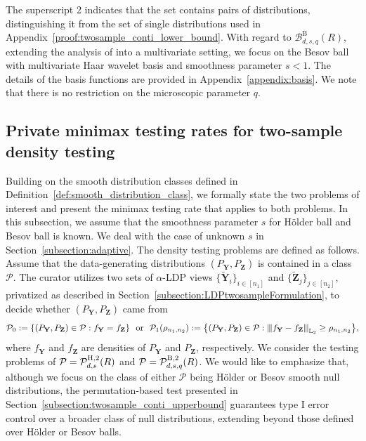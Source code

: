 \documentclass[twoside,11pt]{article}
\newcommand{\distClassGeneric}{\mathcal{P}}
\newcommand{\rhoTwosample}{\rho_{\sampleSize_1, \sampleSize_2}}
\newcommand{\Ell}{\mathbb{L}}
\newcommand{\normEllp}[3]{
	\vertiii{#1}_{\Ell_{#2}}^{#3}
}
\newcommand{\vertiii}[1]{
	{\left\vert\kern-0.25ex\left\vert\kern-0.25ex\left\vert #1 
		\right\vert\kern-0.25ex\right\vert\kern-0.25ex\right\vert}
}%
\newcommand{\rvTwo}{Y}
\newcommand{\vectorize}[1]{\mathbf{#1}}
\newcommand{\rvZ}{Z}
\newcommand{\rVecZ}{\vectorize{\rvZ}}
\newcommand{\rVecZPriv}{\tilde{\rVecZ}} %
\newcommand{\sampleIndexOne}{i}
\newcommand{\sampleIndexTwo}{j}
\newcommand{\sampleSets}[3]{\{{#1}_{#2}\}_{#2 \in [#3]}}
\newcommand{\dimDensity}{d} %
\newcommand{\sampleSize}{n}
\newcommand{\smoothness}{s}
\newcommand{\ballRadius}{R}
\newcommand{\privacyParameter}{\alpha} %
\newcommand{\besovParamMicroscope}{q}
\newcommand{\ballDistn}{\mathcal{B}}
\newcommand{\besovBall}[2]{\ballDistn_{\dimDensity,\smoothness, #2}^{\mathrm{B}}(\ballRadius)}
\newcommand{\pBesovTs}{ %
	\distClassGeneric_{%
		\dimDensity, \smoothness, \besovParamMicroscope
	}^{%
		\mathrm{B,2}
	}
	(\ballRadius)
}
\newcommand{\pHolderTs}{ %
	\distClassGeneric_{%
		\dimDensity, \smoothness
	}^{%
		\mathrm{H,2}
	}
	(\ballRadius)
}
\begin{document}
The superscript 2 indicates that the set contains pairs of distributions, distinguishing it from the set of single distributions used in Appendix~\ref{proof:twosample_conti_lower_bound}.
With regard to $\besovBall{2}{q}$, extending the analysis of \citep{Lam-Weil2021MinimaxConstraint} into a multivariate setting, we focus on the Besov ball with multivariate Haar wavelet basis and smoothness parameter $\smoothness < 1$.
The details of the basis functions are provided in Appendix~\ref{appendix:basis}.
We note that there is no restriction on the microscopic parameter $q$.
%
\subsection{Private minimax testing rates for two-sample density testing}\label{subsection:twosample_conti_rates}
Building on the smooth distribution classes defined in Definition~\ref{def:smooth_distribution_class}, we formally state the two problems of interest and present the minimax testing rate that applies to both problems. In this subsection, we assume that the smoothness parameter $s$ for H\"{o}lder ball and Besov ball is known. We deal with the case of unknown $s$ in Section~\ref{subsection:adaptive}. %
The density testing problems  are defined  as follows.
Assume that the data-generating distributions $(P_{\vectorize{Y}}, P_{\vectorize{Z}})$ is contained in a class $\distClassGeneric$.
The curator utilizes two sets of $\privacyParameter$-LDP views $\sampleSets{\tilde{\vectorize{\rvTwo}}}{\sampleIndexOne}{\sampleSize_1}$ and $\sampleSets{\rVecZPriv}{\sampleIndexTwo}{\sampleSize_2}$, privatized as described in Section~\ref{subsection:LDPtwosampleFormulation},  to decide whether $(P_{\vectorize{Y}}, P_{\vectorize{Z}})$ came from
\begin{equation}\label{hypothesis:twosample_Holder_alt} 
	\distClassGeneric_0
	:=
	\{
	(P_{\vectorize{Y}}, P_{\vectorize{Z}})
	\in
	\distClassGeneric
	:
	f_{\vectorize{Y}}
	= f_{\vectorize{Z}} \}~\text{ or }
	~
	\distClassGeneric_1
	(
	\rho_{n_1,n_2}
	)
	:=
	\bigl\{
	(P_{\vectorize{Y}}, P_{\vectorize{Z}}) \in \distClassGeneric:
	\normEllp{f_{\vectorize{Y}} - f_{\vectorize{Z}}}{2}{} \geq \rhoTwosample
	\bigr\},
\end{equation}
where $f_{\vectorize{Y}}$ and $f_{\vectorize{Z}}$ are densities of $P_{\vectorize{Y}}$ and $P_{\vectorize{Z}}$, respectively.
We consider the testing problems of $\distClassGeneric=\pHolderTs$ and $\distClassGeneric=\pBesovTs$.
We would like to emphasize that, although we focus on the class of either $\distClassGeneric$ being H\"{o}lder or Besov smooth null distributions, the permutation-based test presented in Section~\ref{subsection:twosample_conti_upperbound} guarantees type I error control over a broader class of null distributions, extending beyond those defined over H\"{o}lder or Besov balls.
\end{document}
